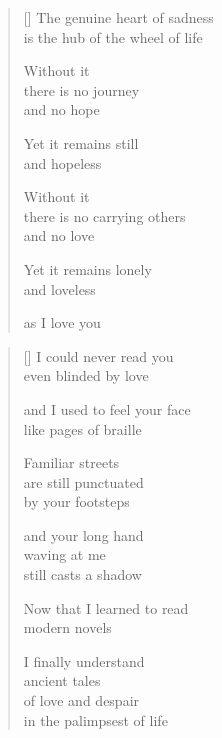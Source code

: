 \documentclass[12pt,a4paper]{article}
\begin{document}
\newpage

\poemtitle{}

\settowidth{\versewidth}{The genuine heart of sadness}

\bigskip

\begin{verse}[\versewidth]
The genuine heart of sadness \\
is the hub of the wheel of life

Without it \\
there is no journey \\
and no hope

Yet it remains still \\
and hopeless

Without it \\
there is no carrying others \\
and no love

Yet it remains lonely \\
and loveless

as I love you
\end{verse}


\newpage

\poemtitle{}

\settowidth{\versewidth}{and I used to feel your face}

\bigskip

\begin{verse}[\versewidth]
  I could never read you \\
  even blinded by love

  and I used to feel your face \\
  like pages of braille

  Familiar streets \\
  are still punctuated \\
  by your footsteps

  and your long hand \\
  waving at me \\
  still casts a shadow

  Now that I learned to read \\
  modern novels

  I finally understand \\
  ancient tales \\
  of love and despair \\
  in the palimpsest of life
\end{verse}
\end{document}
